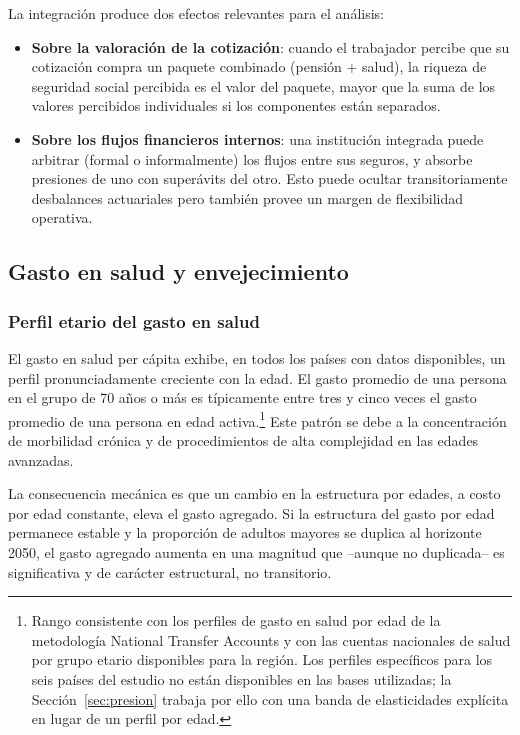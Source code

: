 \documentclass[12pt, letterpaper]{article}
\begin{document}
La integración produce dos efectos relevantes para el análisis:

\begin{itemize}
  \item \textbf{Sobre la valoración de la cotización}: cuando el trabajador percibe
        que su cotización compra un paquete combinado (pensión + salud), la
        riqueza de seguridad social percibida es el valor del paquete, mayor que
        la suma de los valores percibidos individuales si los componentes están
        separados.
  \item \textbf{Sobre los flujos financieros internos}: una institución integrada
        puede arbitrar (formal o informalmente) los flujos entre sus seguros, y
        absorbe presiones de uno con superávits del otro. Esto puede
        ocultar transitoriamente desbalances actuariales pero también provee un
        margen de flexibilidad operativa.
\end{itemize}

\subsection{Gasto en salud y envejecimiento}
\label{sec:salud-envejecimiento}

\subsubsection{Perfil etario del gasto en salud}

El gasto en salud per cápita exhibe, en todos los países con datos disponibles, un
perfil pronunciadamente creciente con la edad. El gasto promedio de una persona en
el grupo de 70 años o más es típicamente entre tres y cinco veces el gasto promedio
de una persona en edad activa.\footnote{Rango consistente con los perfiles de gasto
en salud por edad de la metodología National Transfer Accounts y con las cuentas
nacionales de salud por grupo etario disponibles para la región. Los perfiles
específicos para los seis países del estudio no están disponibles en las bases
utilizadas; la Sección~\ref{sec:presion} trabaja por ello con una banda de
elasticidades explícita en lugar de un perfil por edad.} Este
patrón se debe a la concentración de morbilidad crónica y de procedimientos de alta
complejidad en las edades avanzadas.

La consecuencia mecánica es que un cambio en la estructura por edades, a costo por
edad constante, eleva el gasto agregado. Si la estructura del gasto
por edad permanece estable y la proporción de adultos mayores se duplica al
horizonte 2050, el gasto agregado aumenta en una magnitud que --aunque no
duplicada-- es significativa y de carácter estructural, no transitorio.
\end{document}
